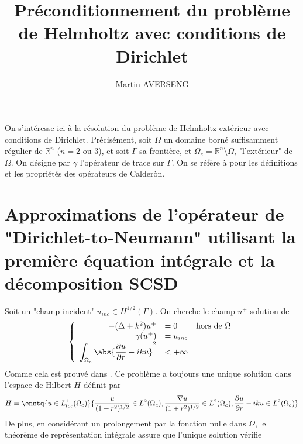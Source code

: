 \documentclass[11pt,a4paper]{article}
\author{Martin AVERSENG}
\title{Préconditionnement du problème de Helmholtz avec conditions de Dirichlet}
\begin{document}
\maketitle
\section*{}

On s'intéresse ici à la résolution du problème de Helmholtz extérieur avec conditions de Dirichlet. Précisément, soit $\Omega$ un domaine borné suffisamment régulier de $\mathbb{R}^n$ ($n=2$ ou $3$), et soit $\Gamma$ sa frontière, et $\Omega_e = \mathbb{R}^n \setminus \overline{\Omega}$, "l'extérieur" de $\Omega$. On désigne par $\gamma$ l'opérateur de trace sur $\Gamma$. On se réfère à \cite{aboudTerrasse} pour les définitions et les propriétés des opérateurs de Calderòn. 

\section{Approximations de l'opérateur de "Dirichlet-to-Neumann" utilisant la première équation intégrale et la décomposition SCSD}

Soit un "champ incident" $u_{inc} \in H^{1/2}(\Gamma)$. On cherche le champ $u^+$ solution de 
\begin{equation}
\left\{
\begin{array}{rll}
-(\Delta+k^2)u^+ &= 0 &\text{hors de $\Omega$}\\
\gamma(u^+) &= u_{inc}\\
\displaystyle\int_{\Omega_e}\abs{\dfrac{\partial u}{\partial r} - iku}^2 &< +\infty \\
\end{array}
\right.
\end{equation}
Comme cela est prouvé dans \cite[Chap. 2, p.105, Theorem 2.6.6]{nedelec2001acoustic}. Ce problème a toujours une unique solution dans l'espace de Hilbert $H$ définit par 
\[ H = \enstq{u \in L^1_{loc}(\Omega_e)}{\dfrac{u}{(1+r^2)^{1/2}} \in L^2(\Omega_e), \dfrac{\nabla u}{(1+r^2)^{1/2}}\in L^2(\Omega_e), \dfrac{\partial u}{\partial r} - iku \in L^2(\Omega_e)}\]
De plus, en considérant un prolongement par la fonction nulle dans $\Omega$, le théorème de représentation intégrale assure que l'unique solution vérifie 
\end{document}
